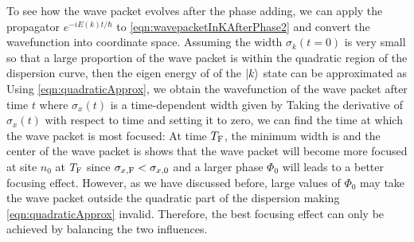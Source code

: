 To see how the wave packet evolves after the phase adding, we can apply the propagator $e^{-i E(k) t/\hbar}$ to 
\autoref{eqn:wavepacketInKAfterPhase2} and convert the wavefunction into coordinate space. Assuming the width
 $\sigma_k(t=0)$ is very small so that a large proportion of the wave packet is within the quadratic region of the
 dispersion curve, then the eigen energy of of the $| k \rangle$ state can be approximated as
Using \autoref{eqn:quadraticApprox},
we obtain the wavefunction of the wave packet after time $t$
where $\sigma_{x}(t)$ is a time-dependent width given by
Taking the derivative of $\sigma_{x}(t)$ with respect to time and setting it to zero, we can find the time at which the
wave packet is most focused:
At time $T_{\rm F}$, the minimum width is
and the center of the wave packet is 
 shows that the wave packet will become more focused at site $n_0$ at $T_{\rm F}$ since $\sigma_{x, {\rm F}} < \sigma _{x, 0} $ and a larger phase $\Phi_0$ will leads to a better focusing effect. However, as we have
discussed before, large values of $\Phi_0$ may take the wave packet outside the quadratic part of the dispersion
 making \autoref{eqn:quadraticApprox} invalid. Therefore, the best focusing effect can only be achieved by balancing
the two influences. 
